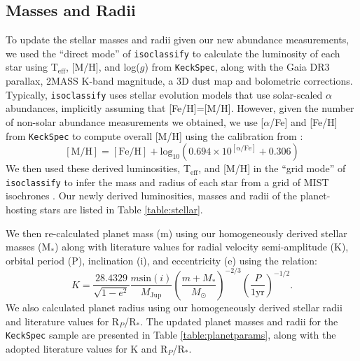 \documentclass[twocolumn]{aastex631}
\begin{document}
\subsection{Masses and Radii}
\label{sec:MandR}

To update the stellar masses and radii given our new abundance measurements, we used the ``direct mode'' of \texttt{isoclassify} \citep{2017ApJ...844..102H} to calculate the luminosity of each star using T$_{\mathrm{eff}}$, [M/H], and log($g$) from \texttt{KeckSpec}, along with the Gaia DR3 parallax, 2MASS K-band magnitude, a 3D dust map and bolometric corrections. Typically, \texttt{isoclassify} uses stellar evolution models that use solar-scaled $\alpha$ abundances, implicitly assuming that [Fe/H]=[M/H]. However, given the number of non-solar abundance measurements we obtained, we use [$\alpha$/Fe] and [Fe/H] from \texttt{KeckSpec} to compute overall [M/H] using the calibration from \cite{1993ApJ...414..580S}:
\begin{equation}
    \mathrm{[M/H]} = \mathrm{[Fe/H]} + \mathrm{log_{10}}(0.694 × 10^{\mathrm{[\alpha/Fe]}} + 0.306)
\end{equation}
We then used these derived luminosities, T$_{\mathrm{eff}}$, and [M/H] in the ``grid mode'' of \texttt{isoclassify} to infer the mass and radius of each star from a grid of MIST isochrones \citep{2016ApJ...823..102C}. Our newly derived luminosities, masses and radii of the planet-hosting stars are listed in Table \ref{table:stellar}. 

We then re-calculated planet mass (m) using our homogeneously derived stellar masses (M$_{*}$) along with literature values for radial velocity semi-amplitude (K), orbital period (P), inclination (i), and eccentricity (e) using the relation:
\begin{equation}
    K=\frac{28.4329}{\sqrt{1-e^{2}}}\frac{m\mathrm{sin}(i)}{M_{\mathrm{Jup}}}(\frac{m+M_{*}}{M_{\odot}})^{-2/3}(\frac{P}{1 \mathrm{yr}})^{-1/2}.
\end{equation} 
We also calculated planet radius using our homogeneously derived stellar radii and literature values for R$_{P}$/R$_{*}$. The updated planet masses and radii for the \texttt{KeckSpec} sample are presented in Table \ref{table:planetparams}, along with the adopted literature values for K and R$_{P}$/R$_{*}$.
\end{document}
